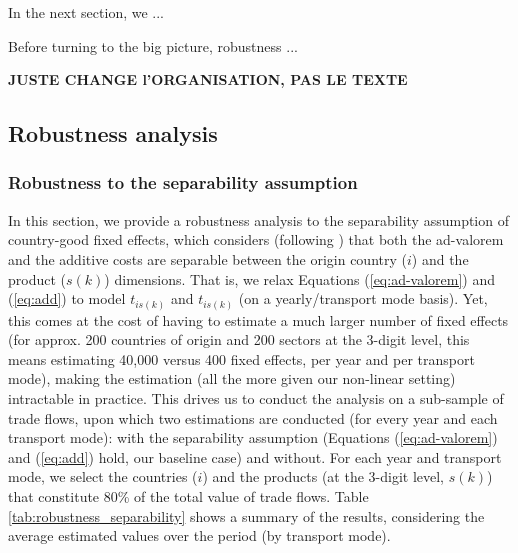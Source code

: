 \documentclass[a4paper,11pt]{article}
\begin{document}
In the next section, we ...

Before turning to the big picture, robustness ...

\textbf{JUSTE CHANGE l'ORGANISATION, PAS LE TEXTE}

\subsection{Robustness analysis \label{sec:robustness}}


\subsubsection{Robustness to the separability assumption}
In this section, we provide a robustness analysis to the separability assumption of country-good fixed effects, which considers (following \citealp{Irrazabal_2015}) that both the ad-valorem and the additive costs are separable between the origin country ($i$) and the product ($s(k)$) dimensions.
That is, we relax Equations (\ref{eq:ad-valorem}) and (\ref{eq:add}) to model $t_{is(k)}$ and $t_{is(k)}$ (on a yearly/transport mode basis).
Yet, this comes at the cost of having to estimate a much larger number of fixed effects (for approx. 200 countries of origin and 200 sectors at the 3-digit level, this means estimating 40,000 versus 400 fixed effects, per year and per transport mode), making the estimation (all the more given our non-linear setting) intractable in practice.
This drives us to conduct the analysis on a sub-sample of trade flows, upon which two estimations are conducted (for every year and each transport mode): with the separability assumption (Equations (\ref{eq:ad-valorem}) and (\ref{eq:add}) hold, our baseline case) and without.
For each year and transport mode, we select the countries ($i$) and the products (at the 3-digit level, $s(k)$) that constitute 80\% of the total value of trade flows. Table \ref{tab:robustness_separability} shows a summary of the results, considering the average estimated values over the period (by transport mode).
\end{document}
